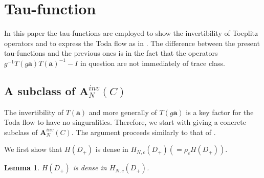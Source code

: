 \documentclass[a4paper]{article}%
\newtheorem{lemma}{Lemma}
\begin{document}
\section{Tau-function}

In this paper the tau-functions are employed to show the invertibility of
Toeplitz operators and to express the Toda flow as in \cite{z}. The difference
between the present tau-functions and the previous ones is in the fact that
the operators $g^{-1}T\left(  g\boldsymbol{a}\right)  T\left(  \boldsymbol{a}%
\right)  ^{-1}-I$ in question are not immediately of trace class.

\subsection{A subclass of $\boldsymbol{A}_{N}^{inv}\left(  C\right)  $}

The invertibility of $T\left(  \boldsymbol{a}\right)  $ and more generally of
$T\left(  g\boldsymbol{a}\right)  $ is a key factor for the Toda flow to have
no singuralities. Therefore, we start with giving a concrete subclass of
$\boldsymbol{A}_{N}^{inv}\left(  C\right)  $. The argument proceeds similarly
to that of \cite{z}.

We first show that $H\left(  D_{+}\right)  $ is dense in $H_{N,c}\left(
D_{+}\right)  \left(  =\rho_{c}H\left(  D_{+}\right)  \right)  $.

\begin{lemma}
\label{l2-1}$H\left(  D_{+}\right)  $ is dense in $H_{N,c}\left(
D_{+}\right)  $.
\end{lemma}
\end{document}

